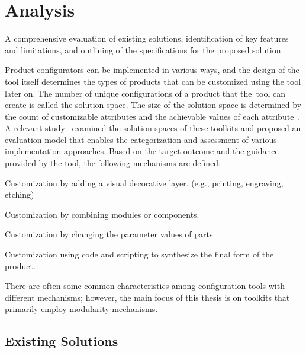 \chapter{Analysis}

\begin{chapterabstract}
A comprehensive evaluation of existing solutions, identification of key features and limitations, and outlining of the specifications for the proposed solution.
\end{chapterabstract}

Product configurators can be implemented in various ways, and the design of the tool itself determines the types of products that can be customized using the tool later on. The number of unique configurations of a product that the~tool can create is called the solution space. The size of the solution space is determined by the count of customizable attributes and the achievable values of each attribute~\cite{Huiwen2018}. A relevant study~\cite{Hermans2012} examined the solution spaces of these toolkits and proposed an evaluation model that enables the categorization and assessment of various implementation approaches. Based on the target outcome and the guidance provided by the tool, the following mechanisms are defined:

\begin{definition}[Veneer]
Customization by adding a visual decorative layer. (e.g., printing, engraving, etching)
\end{definition}
\begin{definition}[Modularity]
Customization by combining modules or components.
\end{definition}
\begin{definition}[Parametric]
Customization by changing the parameter values of parts.
\end{definition}
\begin{definition}[Generative]
Customization using code and scripting to synthesize the final form of the product.
\end{definition}

There are often some common characteristics among configuration tools with different mechanisms; however, the main focus of this thesis is on toolkits that primarily employ modularity mechanisms.
\newpage

\section{Existing Solutions}
